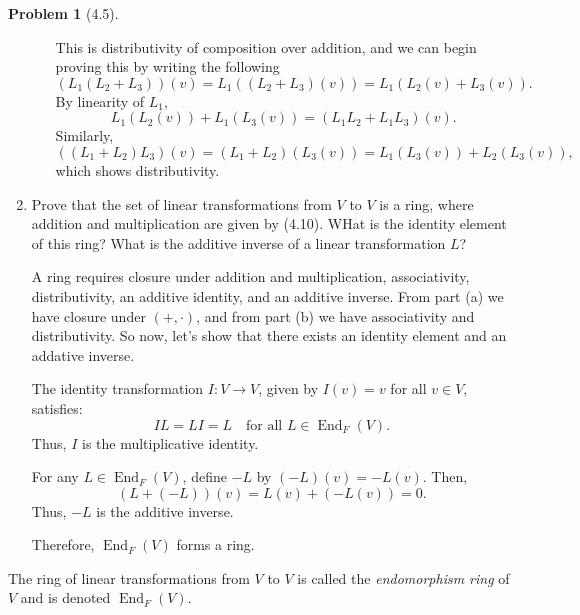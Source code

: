 \documentclass[12pt]{article}
\theoremstyle{definition}
\newtheorem{problem}{Problem}
\DeclareMathOperator{\End}{End}
\begin{document}
\begin{problem}[4.5]
\begin{enumerate}[label=(\alph*)]
\begin{enumerate}[label=(\arabic*)]
                        \begin{solution}
                            This is distributivity of composition over addition, and we can begin proving this 
                            by writing the following
                            \[
                                (L_1 (L_2 + L_3))(v) = L_1((L_2 + L_3)(v)) = L_1(L_2(v) + L_3(v)).
                            \]
                            By linearity of $L_1$,
                            \[
                                L_1(L_2(v)) + L_1(L_3(v)) = (L_1 L_2 + L_1 L_3)(v).
                            \]
                            Similarly,
                            \[
                                ((L_1 + L_2) L_3)(v) = (L_1 + L_2)(L_3(v)) = L_1(L_3(v)) + L_2(L_3(v)),
                            \]
                            which shows distributivity.
                        \end{solution}
              \end{enumerate}

        \item Prove that the set of linear transformations from $V$ to $V$ is a ring, where addition and multiplication
              are given by (4.10). WHat is the identity element of this ring? What is the additive inverse of a linear
              transformation $L$?

        \begin{solution}
            A ring requires closure under addition and multiplication, associativity, distributivity, an additive identity, and an additive inverse.
            From part (a) we have closure under $(+, \cdot)$, and from part (b) we have associativity and distributivity. So now, let's show that 
            there exists an identity element and an addative inverse.
            
            The identity transformation $I: V \to V$, given by $I(v) = v$ for all $v \in V$, satisfies:
            \[
               I L = L I = L \quad \text{for all } L \in \End_F(V).
            \]
            Thus, $I$ is the multiplicative identity.
            
            For any $L \in \End_F(V)$, define $-L$ by $(-L)(v) = -L(v)$. Then,
            \[
               (L + (-L))(v) = L(v) + (-L(v)) = 0.
            \]
            Thus, $-L$ is the additive inverse.
            
            Therefore, $\End_F(V)$ forms a ring.
        \end{solution}
    \end{enumerate}
    The ring of linear transformations from $V$ to $V$ is called the \textit{endomorphism ring} of $V$ and is denoted $\End_F(V)$.
\end{problem}
\end{document}
